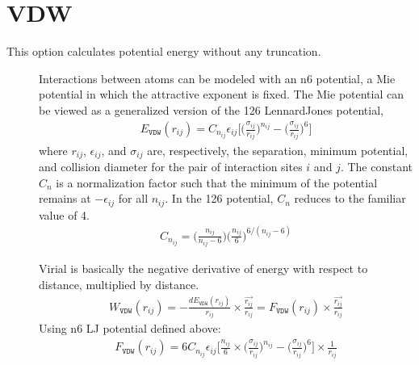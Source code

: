 \documentclass[letterpaper,10pt,english]{sphinxmanual}
\begin{document}
\section{VDW}
\label{\detokenize{vdw_energy:vdw}}
\sphinxAtStartPar
This option calculates potential energy without any truncation.
\begin{description}
\item[{}] \leavevmode
\sphinxAtStartPar
Interactions between atoms can be modeled with an n\sphinxhyphen{}6 potential, a Mie potential in which the attractive exponent is fixed. The Mie potential can be viewed as a generalized version of the 12\sphinxhyphen{}6 Lennard\sphinxhyphen{}Jones potential,
\begin{equation*}
\begin{split}E_{\texttt{VDW}}(r_{ij}) = C_{n_{ij}} \epsilon_{ij} \bigg[\bigg(\frac{\sigma_{ij}}{r_{ij}}\bigg)^{n_{ij}} - \bigg(\frac{\sigma_{ij}}{r_{ij}}\bigg)^6\bigg]\end{split}
\end{equation*}
\sphinxAtStartPar
where \(r_{ij}\), \(\epsilon_{ij}\), and \(\sigma_{ij}\) are, respectively, the separation, minimum potential, and collision diameter for the pair of interaction sites \(i\) and \(j\). The constant \(C_n\) is a normalization factor such that the minimum of the potential remains at \(-\epsilon_{ij}\) for all \(n_{ij}\). In the 12\sphinxhyphen{}6 potential, \(C_n\) reduces to the familiar value of 4.
\begin{equation*}
\begin{split}C_{n_{ij}} = \bigg(\frac{n_{ij}}{n_{ij} - 6} \bigg)\bigg(\frac{n_{ij}}{6} \bigg)^{6/(n_{ij} - 6)}\end{split}
\end{equation*}
\item[{}] \leavevmode
\sphinxAtStartPar
Virial is basically the negative derivative of energy with respect to distance, multiplied by distance.
\begin{equation*}
\begin{split}W_{\texttt{VDW}}(r_{ij}) = -\frac{dE_{\texttt{VDW}}(r_{ij})}{r_{ij}}\times \frac{\overrightarrow{r_{ij}}}{{r_{ij}}} = F_{\texttt{VDW}}(r_{ij}) \times \frac{\overrightarrow{r_{ij}}}{{r_{ij}}}\end{split}
\end{equation*}
\sphinxAtStartPar
Using n\sphinxhyphen{}6 LJ potential defined above:
\begin{equation*}
\begin{split}F_{\texttt{VDW}}(r_{ij}) = 6C_{n_{ij}} \epsilon_{ij} \bigg[\frac{n_{ij}}{6} \times \bigg(\frac{\sigma_{ij}}{r_{ij}}\bigg)^{n_{ij}} - \bigg(\frac{\sigma_{ij}}{r_{ij}}\bigg)^6\bigg]\times \frac{1}{{r_{ij}}}\end{split}
\end{equation*}
\end{description}
\end{document}
